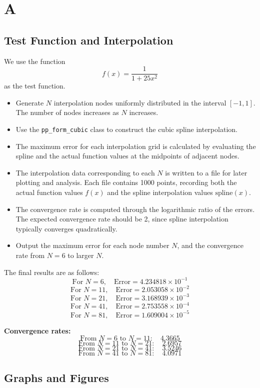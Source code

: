 \documentclass[a4paper]{article}
\begin{document}
\section*{A}
\subsection*{Test Function and Interpolation}
We use the function
\[
f(x) = \frac{1}{1 + 25x^2}
\]
as the test function.

\begin{itemize}
    \item Generate \( N \) interpolation nodes uniformly distributed in the interval \([-1, 1]\). The number of nodes increases as \( N \) increases.
    \item Use the \texttt{pp\_form\_cubic} class to construct the cubic spline interpolation.
    \item The maximum error for each interpolation grid is calculated by evaluating the spline and the actual function values at the midpoints of adjacent nodes.
    \item The interpolation data corresponding to each \( N \) is written to a file for later plotting and analysis. Each file contains 1000 points, recording both the actual function values \( f(x) \) and the spline interpolation values \( \text{spline}(x) \).
    \item The convergence rate is computed through the logarithmic ratio of the errors. The expected convergence rate should be 2, since spline interpolation typically converges quadratically.
    \item Output the maximum error for each node number \( N \), and the convergence rate from \( N = 6 \) to larger \( N \).
\end{itemize}

The final results are as follows:
\[
\text{For } N = 6, \quad \text{Error} = 4.234818 \times 10^{-1}
\]
\[
\text{For } N = 11, \quad \text{Error} = 2.053058 \times 10^{-2}
\]
\[
\text{For } N = 21, \quad \text{Error} = 3.168939 \times 10^{-3}
\]
\[
\text{For } N = 41, \quad \text{Error} = 2.753558 \times 10^{-4}
\]
\[
\text{For } N = 81, \quad \text{Error} = 1.609004 \times 10^{-5}
\]

\textbf{Convergence rates:}
\[
\text{From } N=6 \text{ to } N=11: \quad 4.3665
\]
\[
\text{From } N=11 \text{ to } N=21: \quad 2.6957
\]
\[
\text{From } N=21 \text{ to } N=41: \quad 3.5246
\]
\[
\text{From } N=41 \text{ to } N=81: \quad 4.0971
\]

\subsection*{Graphs and Figures}
\end{document}
